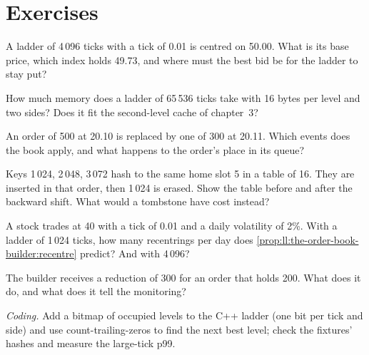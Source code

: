 \section{Exercises}

\begin{exercise}[$\star$]\label{exo:ll:the-order-book-builder:1}
A ladder of 4\,096 ticks with a tick of 0.01 is centred on 50.00. What is its base price, which index holds 49.73, and where
must the best bid be for the ladder to stay put?
\end{exercise}

\begin{exercise}[$\star$]\label{exo:ll:the-order-book-builder:2}
How much memory does a ladder of 65\,536 ticks take with 16 bytes per level and two sides? Does it fit the second-level cache
of chapter~3?
\end{exercise}

\begin{exercise}[$\star$]\label{exo:ll:the-order-book-builder:3}
An order of 500 at 20.10 is replaced by one of 300 at 20.11. Which events does the book apply, and what happens to the order's
place in its queue?
\end{exercise}

\begin{exercise}[$\star\star$]\label{exo:ll:the-order-book-builder:4}
Keys 1\,024, 2\,048, 3\,072 hash to the same home slot 5 in a table of 16. They are inserted in that order, then 1\,024 is
erased. Show the table before and after the backward shift. What would a tombstone have cost instead?
\end{exercise}

\begin{exercise}[$\star\star$]\label{exo:ll:the-order-book-builder:5}
A stock trades at 40 with a tick of 0.01 and a daily volatility of 2\%. With a ladder of 1\,024 ticks, how many recentrings
per day does \cref{prop:ll:the-order-book-builder:recentre} predict? And with 4\,096?
\end{exercise}

\begin{exercise}[$\star\star$]\label{exo:ll:the-order-book-builder:6}
The builder receives a reduction of 300 for an order that holds 200. What does it do, and what does it tell the monitoring?
\end{exercise}

\begin{exercise}[$\star\star\star$]\label{exo:ll:the-order-book-builder:7}
\emph{Coding.} Add a bitmap of occupied levels to the C++ ladder (one bit per tick and side) and use count-trailing-zeros to
find the next best level; check the fixtures' hashes and measure the large-tick p99.
\end{exercise}

